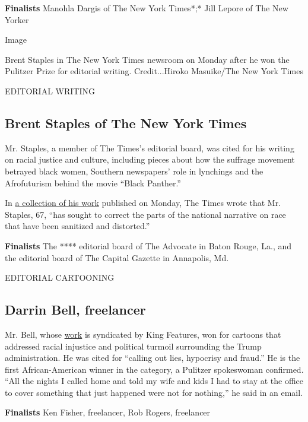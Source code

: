 \textbf{Finalists} Manohla Dargis of The New York Times*;* Jill Lepore
of The New Yorker

Image

Brent Staples in The New York Times newsroom on Monday after he won the
Pulitzer Prize for editorial writing. Credit...Hiroko Masuike/The New
York Times

EDITORIAL WRITING

\hypertarget{brent-staples-of-the-new-york-times}{%
\subsection{Brent Staples of The New York
Times}\label{brent-staples-of-the-new-york-times}}

Mr. Staples, a member of The Times's editorial board, was cited for his
writing on racial justice and culture, including pieces about how the
suffrage movement betrayed black women, Southern newspapers' role in
lynchings and the Afrofuturism behind the movie ``Black Panther.''

In
\href{https://www.nytimes3xbfgragh.onion/2019/04/15/opinion/brent-staples-pulitzer-prize.html}{a
collection of his work} published on Monday, The Times wrote that Mr.
Staples, 67, ``has sought to correct the parts of the national narrative
on race that have been sanitized and distorted.''

\textbf{Finalists} The **** editorial board of The Advocate in Baton
Rouge, La., and the editorial board of The Capital Gazette in Annapolis,
Md.

EDITORIAL CARTOONING

\hypertarget{darrin-bell-freelancer}{%
\subsection{Darrin Bell, freelancer}\label{darrin-bell-freelancer}}

Mr. Bell, whose \href{http://darrinbell.com/}{work} is syndicated by
King Features, won for cartoons that addressed racial injustice and
political turmoil surrounding the Trump administration. He was cited for
``calling out lies, hypocrisy and fraud.'' He is the first
African-American winner in the category, a Pulitzer spokeswoman
confirmed. ``All the nights I called home and told my wife and kids I
had to stay at the office to cover something that just happened were not
for nothing,'' he said in an email.

\textbf{Finalists} Ken Fisher, freelancer, Rob Rogers, freelancer

